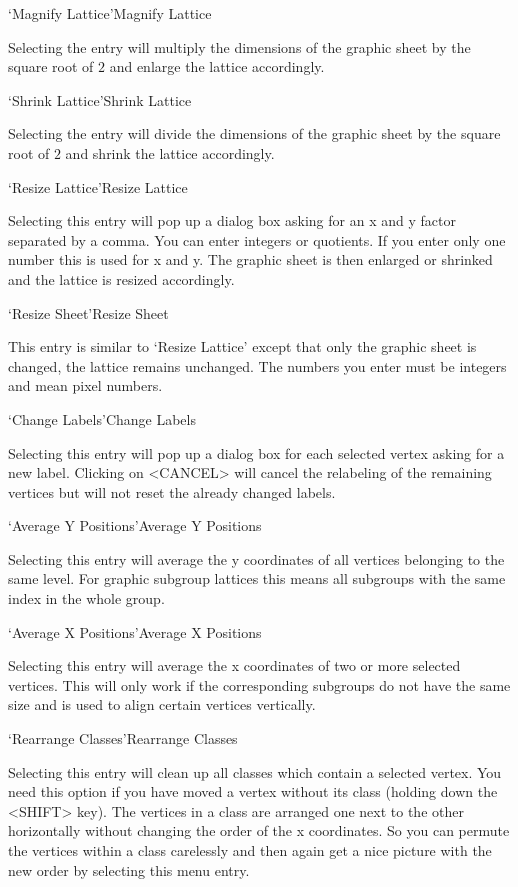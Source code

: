 \>`Magnify Lattice'{Magnify Lattice}

  Selecting the entry will multiply the dimensions of the graphic sheet by
  the square root of $2$ and enlarge the lattice accordingly.

\>`Shrink Lattice'{Shrink Lattice}

  Selecting  the entry will divide the  dimensions  of the graphic sheet by 
  the square root of $2$ and shrink the lattice accordingly.

\>`Resize Lattice'{Resize Lattice}

Selecting this entry will pop up a dialog box asking for an x and y factor
separated by a comma.  You can enter integers or quotients. If you enter
only one number this is used for x and y.  The graphic sheet is then
enlarged or shrinked and the lattice is resized accordingly.

\>`Resize Sheet'{Resize Sheet}

This  entry is similar to `Resize  Lattice' except that  only the graphic
sheet is changed, the lattice remains unchanged. The numbers you enter must 
be integers and mean pixel numbers.

\>`Change Labels'{Change Labels}

Selecting  this entry will pop  up a dialog  box for each selected vertex
asking for a new label.  Clicking on <CANCEL>  will cancel the relabeling
of the remaining vertices but will not reset the already changed labels.

\>`Average Y Positions'{Average Y Positions}

Selecting this entry will average the y coordinates of all vertices
belonging to the same level. For graphic subgroup lattices this means all
subgroups with the same index in the whole group.

\>`Average X Positions'{Average X Positions}

Selecting this entry  will  average the x   coordinates  of two or   more
selected vertices.  This will only work if the corresponding subgroups do
not have the same size and is used to align certain vertices
vertically.

\>`Rearrange Classes'{Rearrange Classes}

Selecting this entry will clean up all classes which contain a selected
vertex. You need this option if you have moved a vertex without its class
(holding down the <SHIFT> key). The vertices in a class are arranged one
next to the other horizontally without changing the order of the x
coordinates. So you can permute the vertices within a class carelessly and
then again get a nice picture with the new order by selecting this menu
entry.

